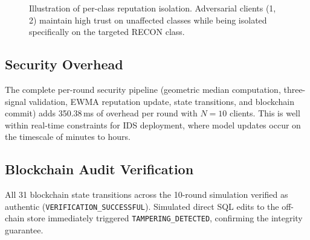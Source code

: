 \documentclass[conference]{IEEEtran}
\begin{document}
\begin{figure}[t]
\centering
{}
\caption{Illustration of per-class reputation isolation. Adversarial clients (1, 2) maintain high trust on unaffected classes while being isolated specifically on the targeted RECON class.}
\label{fig:trust_heatmap_desc}
\end{figure}

\subsection{Security Overhead}
The complete per-round security pipeline (geometric median computation, three-signal validation, EWMA reputation update, state transitions, and blockchain commit) adds 350.38\,ms of overhead per round with $N = 10$ clients. This is well within real-time constraints for IDS deployment, where model updates occur on the timescale of minutes to hours.

\subsection{Blockchain Audit Verification}
All 31 blockchain state transitions across the 10-round simulation verified as authentic (\texttt{VERIFICATION\_SUCCESSFUL}). Simulated direct SQL edits to the off-chain store immediately triggered \texttt{TAMPERING\_DETECTED}, confirming the integrity guarantee.
\end{document}
